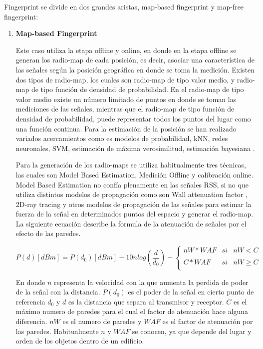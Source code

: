 Fingerprint se divide en dos grandes aristas, map-based fingerprint y map-free fingerprint:

\begin{enumerate}
\item \textbf{Map-based Fingerprint}

Este caso utiliza la etapa offline y online, en donde en la etapa offline se generan los radio-map de cada posición, es decir, asociar una característica de las señales según la posición geográfica en donde se toma la medición. Existen dos tipos de radio-map, los cuales son radio-map de tipo valor medio, y radio-map de tipo función de densidad de probabilidad. En el radio-map de tipo valor medio existe un número limitado de puntos en donde se toman las mediciones de las señales, mientras que el radio-map de tipo función de densidad de probabilidad, puede representar todos los puntos del lugar como una función continua. Para la estimación de la posición se han realizado variados acercamientos como es modelos de probabilidad, kNN, redes neuronales, SVM, estimación de máxima verosimilitud, estimación bayesiana \citep{Liu:2007:SWI:2220431.2221077, 1192765}.

Para la generación de los radio-maps se utiliza habitualmente tres técnicas, las cuales son Model Based Estimation, Medición Offline y calibración online. Model Based Estimation no confía plenamente en las señales RSS, si no que utiliza distintos modelos de propagación como son Wall attenuation factor \citep{Bahl00radar:an} , 2D-ray tracing y otros modelos de propagación de las señales para estimar la fuerza de la señal en determinados puntos del espacio y generar el radio-map. La siguiente ecuación describe la formula de la atenuación de señales por el efecto de las paredes.

\begin{equation}
P(d)[dBm] = P(d_{0})[dBm] - 10nlog (\frac{d}{d_{0}}) - \left\{ \begin{array}{lcc}
             nW*WAF &   si  & nW < C \\
             \\ C*WAF &  si & nW \geq C \\
             \end{array} \right.
\end{equation}

   

En donde \(n\) representa la velocidad con la que aumenta la perdida de poder de la señal con la distancia. \(P(d_{0})\) es el poder de la señal en cierto punto de referencia \(d_{0}\) y \(d\) es la distancia que separa al transmisor y receptor. \(C\) es el máximo numero de paredes para el cual el factor de atenuación hace alguna diferencia. \(nW\) es el numero de paredes y \(WAF\) es el factor de atenuación por las paredes. Habitualmente \(n\) y \(WAF\) se conocen, ya que depende del lugar y orden de los objetos dentro de un edificio.


\end{enumerate}
